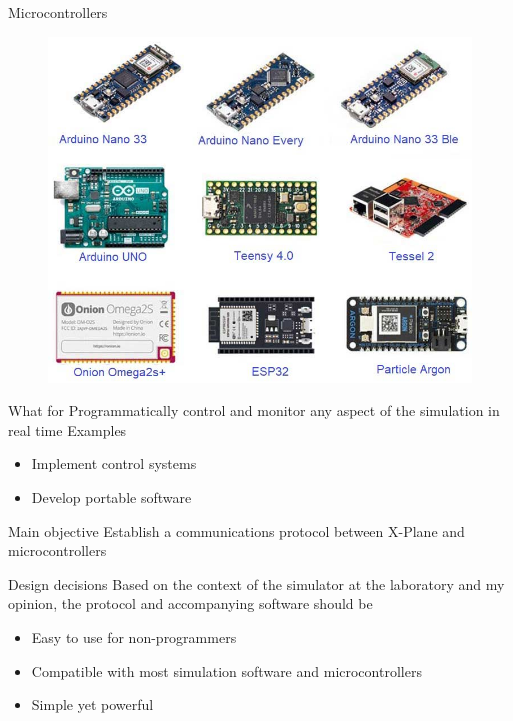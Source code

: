 \documentclass[12pt,aspectratio=169]{beamer}
\begin{document}
\begin{frame}{Microcontrollers}
	\begin{figure}
		\includegraphics[height=0.7\textheight]{boards.jpg}
	\end{figure}
\end{frame}

\begin{frame}{What for}
\pause
Programmatically control and monitor any aspect of the simulation in real time
\pause
\newline
\newline
Examples
\begin{itemize}
	\item Implement control systems
	\item Develop portable software
\end{itemize}

\end{frame}

\begin{frame}{Main objective}
Establish a communications protocol between X-Plane and microcontrollers
\end{frame}

\begin{frame}{Design decisions}
Based on the context of the simulator at the laboratory and my opinion, the protocol and accompanying software should be
\begin{itemize}
	\item <2-> Easy to use for non-programmers
	\item <3-> Compatible with most simulation software and microcontrollers
	\item <4-> Simple yet powerful 
\end{itemize}
\end{frame}
\end{document}
